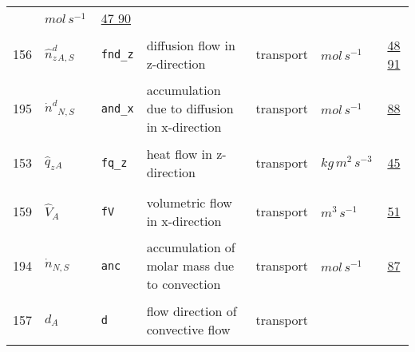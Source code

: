 \begin{longtable}{|p{1cm}|p{2.5cm}|p{4.5cm}|p{8cm}|p{3.0cm}|p{3cm}|p{1cm}|}
             & $ mol \,s^{-1} \, $
             &                 \hyperlink{"e:47"}{ 47 }
                                 \hyperlink{"e:90"}{ 90 }
                 \\
            156
             & \hypertarget{"v:156"}{ $ {{\hat{n}^{d}_z}}{_{A, S}} $}
             & \verb|fnd_z|
             & diffusion flow in z-direction
             & \begin{lay}transport \end{lay}
             & $ mol \,s^{-1} \, $
             &                 \hyperlink{"e:48"}{ 48 }
                                 \hyperlink{"e:91"}{ 91 }
                 \\
            195
             & \hypertarget{"v:195"}{ $ {{\dot{n}^d}}{_{N, S}} $}
             & \verb|and_x|
             & accumulation due to diffusion in x-direction
             & \begin{lay}transport \end{lay}
             & $ mol \,s^{-1} \, $
             &                 \hyperlink{"e:88"}{ 88 }
                 \\
            153
             & \hypertarget{"v:153"}{ $ {{\hat{q}_z}}{_{A}} $}
             & \verb|fq_z|
             & heat flow in z-direction
             & \begin{lay}transport \end{lay}
             & $ kg \,m^{2} \,s^{-3} \, $
             &                 \hyperlink{"e:45"}{ 45 }
                 \\
            159
             & \hypertarget{"v:159"}{ $ {{\hat{V}}}{_{A}} $}
             & \verb|fV|
             & volumetric flow in x-direction
             & \begin{lay}transport \end{lay}
             & $ m^{3} \,s^{-1} \, $
             &                 \hyperlink{"e:51"}{ 51 }
                 \\
            194
             & \hypertarget{"v:194"}{ $ {{\dot{n}}}{_{N, S}} $}
             & \verb|anc|
             & accumulation of molar mass due to convection
             & \begin{lay}transport \end{lay}
             & $ mol \,s^{-1} \, $
             &                 \hyperlink{"e:87"}{ 87 }
                 \\
            157
             & \hypertarget{"v:157"}{ $ {d}{_{A}} $}
             & \verb|d|
             & flow direction of convective flow
             & \begin{lay}transport \end{lay}

\end{longtable}
